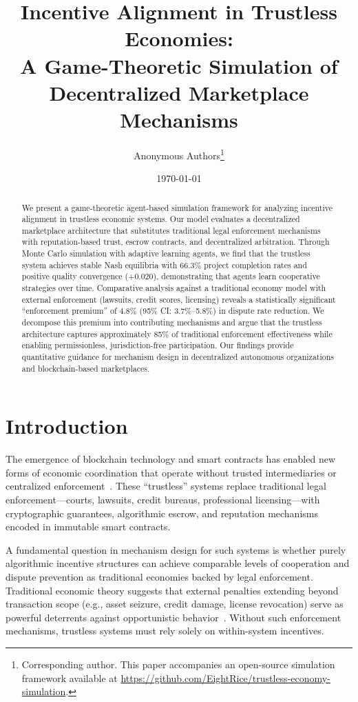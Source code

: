 \documentclass[11pt,a4paper]{article}
\title{Incentive Alignment in Trustless Economies: \\
A Game-Theoretic Simulation of Decentralized Marketplace Mechanisms}
\author{
Anonymous Authors\thanks{Corresponding author. This paper accompanies an open-source simulation framework available at \url{https://github.com/EightRice/trustless-economy-simulation}.}
}
\date{\today}
\begin{document}
\maketitle

\begin{abstract}
We present a game-theoretic agent-based simulation framework for analyzing incentive alignment in trustless economic systems. Our model evaluates a decentralized marketplace architecture that substitutes traditional legal enforcement mechanisms with reputation-based trust, escrow contracts, and decentralized arbitration. Through Monte Carlo simulation with adaptive learning agents, we find that the trustless system achieves stable Nash equilibria with 66.3\% project completion rates and positive quality convergence (+0.020), demonstrating that agents learn cooperative strategies over time. Comparative analysis against a traditional economy model with external enforcement (lawsuits, credit scores, licensing) reveals a statistically significant ``enforcement premium'' of 4.8\% (95\% CI: 3.7\%--5.8\%) in dispute rate reduction. We decompose this premium into contributing mechanisms and argue that the trustless architecture captures approximately 85\% of traditional enforcement effectiveness while enabling permissionless, jurisdiction-free participation. Our findings provide quantitative guidance for mechanism design in decentralized autonomous organizations and blockchain-based marketplaces.
\end{abstract}

\section{Introduction}

The emergence of blockchain technology and smart contracts has enabled new forms of economic coordination that operate without trusted intermediaries or centralized enforcement~\citep{nakamoto2008bitcoin, buterin2014ethereum}. These ``trustless'' systems replace traditional legal enforcement---courts, lawsuits, credit bureaus, professional licensing---with cryptographic guarantees, algorithmic escrow, and reputation mechanisms encoded in immutable smart contracts.

A fundamental question in mechanism design for such systems is whether purely algorithmic incentive structures can achieve comparable levels of cooperation and dispute prevention as traditional economies backed by legal enforcement. Traditional economic theory suggests that external penalties extending beyond transaction scope (e.g., asset seizure, credit damage, license revocation) serve as powerful deterrents against opportunistic behavior~\citep{williamson1985economic}. Without such enforcement mechanisms, trustless systems must rely solely on within-system incentives.
\end{document}
